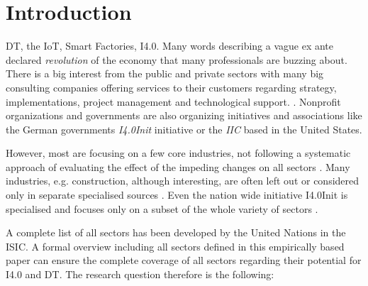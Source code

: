 \section{Introduction}\label{Introduction}
\ac{DT}, the \ac{IoT}, Smart Factories,
\ac{I4.0}. Many words describing a vague ex ante declared
\emph{revolution} of the economy that many professionals are buzzing
about.
There is a big interest from the public and private sectors with many big consulting companies offering services to their customers regarding strategy, implementations, project management and technological support.
\cite{westerman2011digital,mckinsey-nine-questions,bcg-dt,accenture-dt:2015}.
Nonprofit organizations and governments are also organizing initiatives and associations like the German governments \emph{\ac{I4.0Init}} \cite{i40-web} initiative or the \emph{\ac{IIC}} \cite{iic-web} based in the United States.

However, most are focusing on a few core industries, not following a systematic approach of evaluating the effect of the impeding changes on all sectors \cite{westerman2011digital, pwc2016survey}. 
Many industries, e.g. construction, although interesting, are often left out or considered only in separate specialised sources \cite{rolandbergerBauwirtschaft:2016}. 
Even the nation wide initiative \acl{I4.0Init} is specialised and focuses only on a subset of the whole variety of sectors \cite{umsetzungsstrategie:2015}. 

A complete list of all sectors has been developed by the United Nations in the \ac{ISIC}\cite{ISIC:2008}. A formal overview including all sectors defined in this empirically based paper can ensure the complete coverage of all sectors regarding their potential for \ac{I4.0} and \ac{DT}. The research question therefore is the following:

